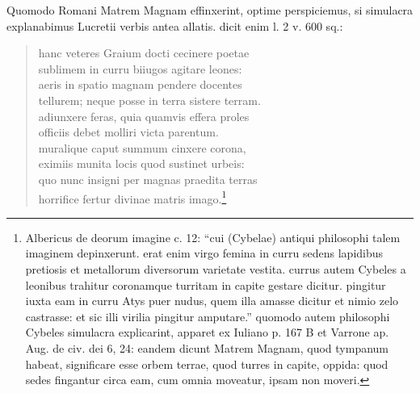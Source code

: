 \documentclass[a4paper, 11pt, oneside, polutonikogreek, german]{article}
\begin{document}
Quomodo Romani Matrem Magnam effinxerint, optime perspiciemus, si simulacra explanabimus Lucretii verbis antea allatis. dicit enim l. 2 v. 600 sq.:
\begin{quotation}
hanc veteres Graium docti cecinere poetae\\\hspace*{5mm}sublimem in curru biiugos agitare leones:\\\hspace*{5mm}aeris in spatio magnam pendere docentes\\\hspace*{5mm}tellurem; neque posse in terra sistere terram.\\\hspace*{5mm}adiunxere feras, quia quamvis effera proles\\\hspace*{5mm}officiis debet molliri victa parentum.\\\hspace*{5mm}muralique caput summum cinxere corona,\\\hspace*{5mm}eximiis munita locis quod sustinet urbeis:\\\hspace*{5mm}quo nunc insigni per magnas praedita terras\\\hspace*{5mm}horrifice fertur divinae matris imago.\footnote{Albericus de deorum imagine c. 12: "`cui (Cybelae) antiqui philosophi talem imaginem depinxerunt. erat enim virgo femina in curru sedens lapidibus pretiosis et metallorum diversorum varietate vestita. currus autem Cybeles a leonibus trahitur coronamque turritam in capite gestare dicitur. pingitur iuxta eam in curru Atys puer nudus, quem illa amasse dicitur et nimio zelo castrasse: et sic illi virilia pingitur amputare."' quomodo autem philosophi Cybeles simulacra explicarint, apparet ex Iuliano p. 167 B et Varrone ap. Aug. de civ. dei 6, 24: eandem dicunt Matrem Magnam, quod tympanum habeat, significare esse orbem terrae, quod turres in capite, oppida: quod sedes fingantur circa eam, cum omnia moveatur, ipsam non moveri.}
\end{quotation}
\end{document}

